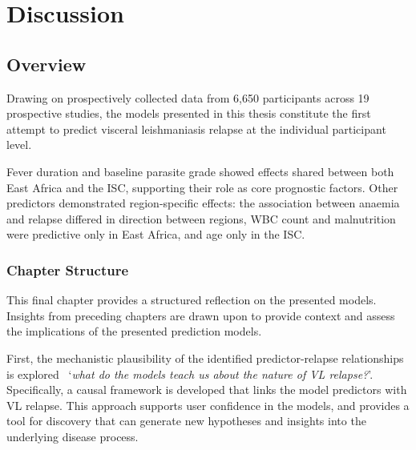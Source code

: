 \chapter{\label{ch:6-discussion}Discussion}
\minitoc{}

\section{Overview}



Drawing on prospectively collected data from 6,650 participants across 19 prospective studies, the models presented in this thesis constitute the first attempt to predict visceral leishmaniasis relapse at the individual participant level.

Fever duration and baseline parasite grade showed effects shared between both East Africa and the ISC, supporting their role as core prognostic factors. Other predictors demonstrated region-specific effects: the association between anaemia and relapse differed in direction between regions, WBC count and malnutrition were predictive only in East Africa, and age only in the ISC.

\subsection{Chapter Structure}

This final chapter provides a structured reflection on the presented models. Insights from preceding chapters are drawn upon to provide context and assess the implications of the presented prediction models.

First, the mechanistic plausibility of the identified predictor-relapse relationships is explored \textemdash\ `\textit{what do the models teach us about the nature of VL relapse?}'. Specifically, a causal framework is developed that links the model predictors with VL relapse. This approach supports user confidence in the models, and provides a tool for discovery that can generate new hypotheses and insights into the underlying disease process.

